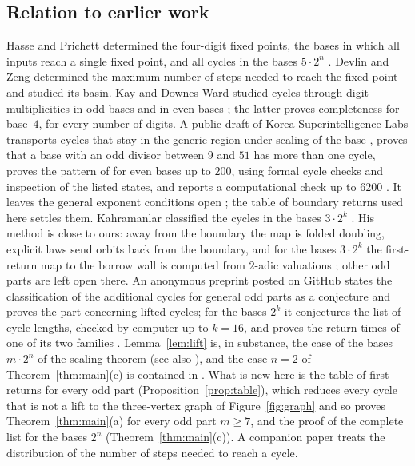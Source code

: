 \documentclass[11pt]{amsart}
\theoremstyle{definition}
\theoremstyle{remark}
\begin{document}
\subsection*{Relation to earlier work}
Hasse and Prichett \cite{HP} determined the four-digit fixed points, the bases in which all inputs reach a single fixed point, and all cycles in the bases $5\cdot2^n$ \cite[Theorem~4.1]{HP}. Devlin and Zeng \cite{DZ} determined the maximum number of steps needed to reach the fixed point and studied its basin. Kay and Downes-Ward studied cycles through digit multiplicities in odd bases \cite{KD22} and in even bases \cite{KD24}; the latter proves completeness for base~$4$, for every number of digits. A public draft of Korea Superintelligence Labs \cite{KSL} transports cycles that stay in the generic region under scaling of the base \cite[Theorem~3.2]{KSL}, proves that a base with an odd divisor between $9$ and $51$ has more than one cycle, proves the pattern of \cite[Remark~28]{COST} for even bases up to $200$, using formal cycle checks and inspection of the listed states, and reports a computational check up to $6200$ \cite[Theorem~7.1, Remark~7.2 and Section~10]{KSL}. It leaves the general exponent conditions open \cite[Section~9]{KSL}; the table of boundary returns used here settles them. Kahramanlar classified the cycles in the bases $3\cdot2^k$ \cite{Kah}. His method is close to ours: away from the boundary the map is folded doubling, explicit laws send orbits back from the boundary, and for the bases $3\cdot2^k$ the first-return map to the borrow wall is computed from $2$-adic valuations \cite[Sections~2, 3 and~5]{Kah}; other odd parts are left open there. An anonymous preprint posted on GitHub states the classification of the additional cycles for general odd parts as a conjecture and proves the part concerning lifted cycles; for the bases $2^k$ it conjectures the list of cycle lengths, checked by computer up to $k=16$, and proves the return times of one of its two families \cite{Sky}. Lemma~\ref{lem:lift} is, in substance, the case of the bases $m\cdot2^n$ of the scaling theorem \cite[Theorems~3.1 and~3.2]{KSL} (see also \cite{Sky}), and the case $n=2$ of Theorem~\ref{thm:main}(c) is contained in \cite{KD24}. What is new here is the table of first returns for every odd part (Proposition~\ref{prop:table}), which reduces every cycle that is not a lift to the three-vertex graph of Figure~\ref{fig:graph} and so proves Theorem~\ref{thm:main}(a) for every odd part $m\ge7$, and the proof of the complete list for the bases $2^n$ (Theorem~\ref{thm:main}(c)). A companion paper treats the distribution of the number of steps needed to reach a cycle.
\end{document}
